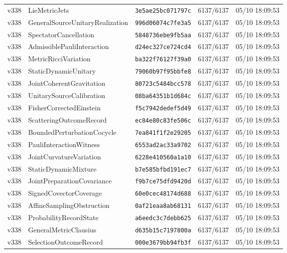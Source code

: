 \documentclass[11pt]{article}
\theoremstyle{definition}\newtheorem{deriv}{Derivação}
\begin{document}
{\begin{longtable}{@{}lllll@{}}
v338 & LieMetricJets & \texttt{3e5ae25bc071797c} & 6137/6137 & 05/10 18:09:53 \\
v338 & GeneralSourceUnitaryRealization & \texttt{996d06074c7fe3a5} & 6137/6137 & 05/10 18:09:53 \\
v338 & SpectatorCancellation & \texttt{5848736ebe9fb5aa} & 6137/6137 & 05/10 18:09:53 \\
v338 & AdmissiblePauliInteraction & \texttt{d24ec327ce724cd4} & 6137/6137 & 05/10 18:09:53 \\
v338 & MetricRicciVariation & \texttt{ba322f76127f39a0} & 6137/6137 & 05/10 18:09:53 \\
v338 & StaticDynamicUnitary & \texttt{79060b97f95bbfe8} & 6137/6137 & 05/10 18:09:53 \\
v338 & JointCoherentGravitation & \texttt{80723c5484bcc578} & 6137/6137 & 05/10 18:09:53 \\
v338 & UnitarySourceCalibration & \texttt{08ba64351b1d684c} & 6137/6137 & 05/10 18:09:53 \\
v338 & FisherCorrectedEinstein & \texttt{f5c7942dedef5d49} & 6137/6137 & 05/10 18:09:53 \\
v338 & ScatteringOutcomeRecord & \texttt{ec84e80c83fe506c} & 6137/6137 & 05/10 18:09:53 \\
v338 & BoundedPerturbationCocycle & \texttt{7ea841f1f2e29205} & 6137/6137 & 05/10 18:09:53 \\
v338 & PauliInteractionWitness & \texttt{6553ad2ac33a9702} & 6137/6137 & 05/10 18:09:53 \\
v338 & JointCurvatureVariation & \texttt{6228e410560a1a10} & 6137/6137 & 05/10 18:09:53 \\
v338 & StaticDynamicMixture & \texttt{b7e585bfbd191ec7} & 6137/6137 & 05/10 18:09:53 \\
v338 & JointPreparationCovariance & \texttt{f9b7ce75dfd9420d} & 6137/6137 & 05/10 18:09:53 \\
v338 & SignedCovectorCoverage & \texttt{60e0cec48174d688} & 6137/6137 & 05/10 18:09:53 \\
v338 & AffineSamplingObstruction & \texttt{0af21eaa8ab68131} & 6137/6137 & 05/10 18:09:53 \\
v338 & ProbabilityRecordState & \texttt{a6eedc3c7debb625} & 6137/6137 & 05/10 18:09:53 \\
v338 & GeneralMetricClausius & \texttt{d635b15c7197800a} & 6137/6137 & 05/10 18:09:53 \\
v338 & SelectionOutcomeRecord & \texttt{000e3679bb94fb3f} & 6137/6137 & 05/10 18:09:53 \\

\end{longtable}}
\end{document}
